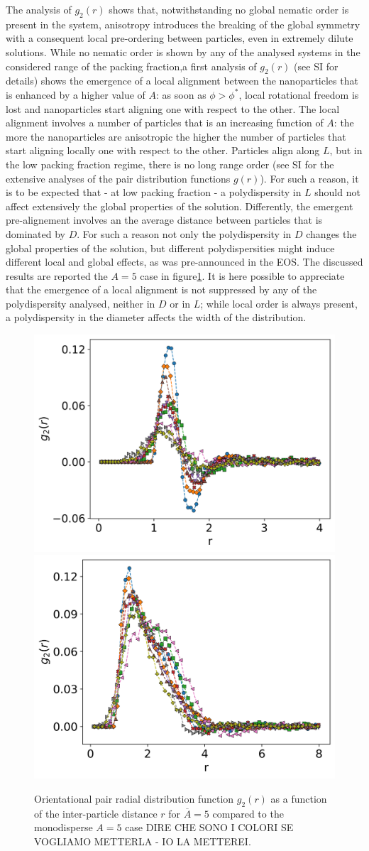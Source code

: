 \documentclass[journal=jacsat,manuscript=article]{achemso}
\begin{document}
The analysis of $g_2(r)$ shows that, notwithstanding no global nematic order is present in the system, anisotropy introduces the breaking of the global symmetry with a consequent local pre-ordering between particles, even in extremely dilute solutions. While no nematic order is shown by any of the analysed systems in the considered range of the packing fraction,a first analysis of $g_2(r)$ (see SI for details) shows the emergence of a local alignment between the nanoparticles that is enhanced by a higher value of $A$: as soon as $\phi >\phi^*$, local rotational freedom is lost and nanoparticles start aligning one with respect to the other. The local alignment involves a number of particles that is an increasing function of $A$: the more the nanoparticles are anisotropic the higher the number of particles that start aligning locally one with respect to the other.   Particles align along $L$, but in the low packing fraction regime, there is no long range order (see SI for the extensive analyses of the pair distribution functions $g(r)$). For such a reason, it is to be expected that - at low packing fraction - a  polydispersity in $L$ should not  affect extensively the global properties of the solution. 
Differently,  the emergent pre-alignement involves an the average distance between particles that is dominated by $D$. For such a reason not only the polydispersity in $D$ changes the global properties of the solution, but different polydispersities might induce  different local and global effects, as was pre-announced in the EOS. The discussed results are reported  the $A=5$ case in figure\ref{fig:G_or_A5}. It is here possible to appreciate that the emergence of a local alignment is not suppressed by any of the polydispersity analysed, neither in $D$ or in $L$;  while local order is always present,  a polydispersity in the diameter affects the width of the distribution.
  \begin{figure}[!h]
    \centering
    \includegraphics[width=0.45 \columnwidth]{Figures/G_or_A1.png}
    \includegraphics[width=0.45 \columnwidth]{Figures/G_or_A5.png}
    \caption{Orientational pair radial distribution function $g_2(r)$ as a function of the inter-particle distance $r$ for  $\overline{A}=5$  compared to the monodisperse $A=5$ case DIRE CHE SONO I COLORI SE VOGLIAMO METTERLA - IO LA METTEREI.}
    \label{fig:G_or_A5}
\end{figure}
 
\end{document}
